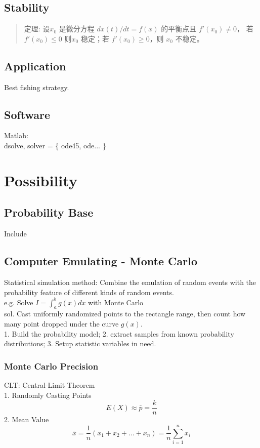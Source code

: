 \documentclass[12pt,a4paper]{article} \usepackage{kurier}
\begin{document}
\begin{CJK}{UTF8}{gkai}
\begin{multicols}{2}
	\subsection{Stability}
		\begin{quote}定理: 设$x_0$ 是微分方程 $ dx(t)/dt = f(x) $ 的平衡点且 $f'(x_0) \neq 0$，
		若$f'(x_0) \le 0 $ 则$ x_0$ 稳定；若 $f'(x_0) \ge 0$，则 $x_0$ 不稳定。
		\end{quote}
	\subsection{Application}
		Best fishing strategy.
	\subsection{Software}
		Matlab:\\
			dsolve, solver = \{ ode45, ode... \}

\end{multicols}

\newpage
\section{Possibility}
\begin{multicols}{2}
	\subsection{Probability Base}
		Include \cite{probbase}
	\subsection{Computer Emulating - Monte Carlo}
		Statistical simulation method: Combine the emulation of
		random events with the probability feature of different kinds of random events.\\
		e.g. Solve $ I = \int_a^b g(x) dx $ with Monte Carlo\\
		sol. Cast uniformly randomized points to the rectangle range, then count how many point
		dropped under the curve $g(x)$.\\
		1. Build the probability model; 2. extract samples from known probability distributions;
		3. Setup statistic variables in need.
		\subsubsection{Monte Carlo Precision}
			CLT: Central-Limit Theorem\\
			1. Randomly Casting Points
				\[ E(X) \approx \bar{p} = \frac{k}{n} \]
			2. Mean Value
				\[ \bar{x} = \frac{1}{n}(x_1 + x_2 + \ldots + x_n) = \frac{1}{n} \sum_{i=1}^n x_i\]

\end{multicols}
\end{CJK}
\end{document}
